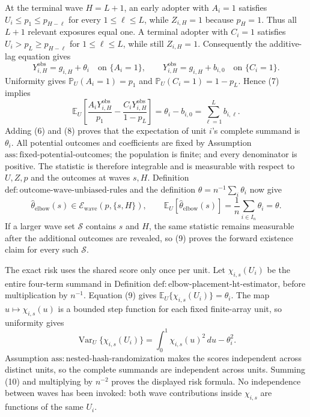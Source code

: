 At the terminal wave \(H=L+1\), an early adopter with \(A_i=1\) satisfies \(U_i\leq p_1\leq p_{H-\ell}\) for every \(1\leq\ell\leq L\), while \(Z_{i,H}=1\) because \(p_H=1\).  Thus all \(L+1\) relevant exposures equal one.  A terminal adopter with \(C_i=1\) satisfies \(U_i>p_L\geq p_{H-\ell}\) for \(1\leq\ell\leq L\), while still \(Z_{i,H}=1\).  Consequently the additive-lag equation gives
\[
 Y^{\mathrm{obs}}_{i,H}=g_{i,H}+\theta_i
 \quad\text{on }\{A_i=1\},
 \qquad
 Y^{\mathrm{obs}}_{i,H}=g_{i,H}+b_{i,0}
 \quad\text{on }\{C_i=1\}.
\tag{7}
\]
Uniformity gives \(\mathbb P_U(A_i=1)=p_1\) and \(\mathbb P_U(C_i=1)=1-p_L\).  Hence (7) implies
\[
 \mathbb E_U\!\left[
 \frac{A_iY^{\mathrm{obs}}_{i,H}}{p_1}
 -\frac{C_iY^{\mathrm{obs}}_{i,H}}{1-p_L}
 \right]
 =\theta_i-b_{i,0}
 =\sum_{\ell=1}^{L}b_{i,\ell}.
\tag{8}
\]
Adding (6) and (8) proves that the expectation of unit \(i\)'s complete summand is \(\theta_i\).  All potential outcomes and coefficients are fixed by Assumption \(\mathrm{ass:fixed\text{-}potential\text{-}outcomes}\); the population is finite; and every denominator is positive.  The statistic is therefore integrable and is measurable with respect to \(U,Z,p\) and the outcomes at waves \(s,H\).  Definition \(\mathrm{def:outcome\text{-}wave\text{-}unbiased\text{-}rules}\) and the definition \(\theta=n^{-1}\sum_i\theta_i\) now give
\[
 \widehat\theta_{\mathrm{elbow}}(s)
 \in\mathcal E_{\mathrm{wave}}(p,\{s,H\}),
 \qquad
 \mathbb E_U\!\left[\widehat\theta_{\mathrm{elbow}}(s)\right]
 =\frac1n\sum_{i\in I_n}\theta_i=\theta.
\tag{9}
\]
If a larger wave set \(\mathcal S\) contains \(s\) and \(H\), the same statistic remains measurable after the additional outcomes are revealed, so (9) proves the forward existence claim for every such \(\mathcal S\).

The exact risk uses the shared score only once per unit.  Let \(\chi_{i,s}(U_i)\) be the entire four-term summand in Definition \(\mathrm{def:elbow\text{-}placement\text{-}ht\text{-}estimator}\), before multiplication by \(n^{-1}\).  Equation (9) gives \(\mathbb E_U\{\chi_{i,s}(U_i)\}=\theta_i\).  The map \(u\mapsto\chi_{i,s}(u)\) is a bounded step function for each fixed finite-array unit, so uniformity gives
\[
 \operatorname{Var}_U\{\chi_{i,s}(U_i)\}
 =\int_0^1\chi_{i,s}(u)^2\,du-\theta_i^2.
\tag{10}
\]
Assumption \(\mathrm{ass:nested\text{-}hash\text{-}randomization}\) makes the scores independent across distinct units, so the complete summands are independent across units.  Summing (10) and multiplying by \(n^{-2}\) proves the displayed risk formula.  No independence between waves has been invoked: both wave contributions inside \(\chi_{i,s}\) are functions of the same \(U_i\).

